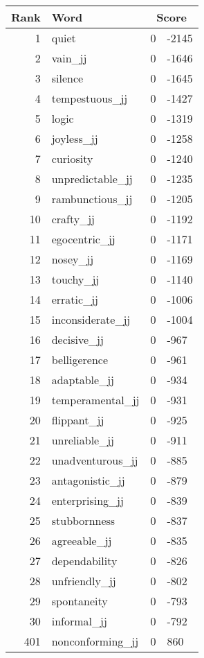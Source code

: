 \begin{longtable}[!htbp]{| rlr@{.}l |}
    \hline
    \textbf{Rank} & \textbf{Word} & \multicolumn{2}{c|}{\textbf{Score}} \\
    \hline
    \endhead
    1 & quiet & 0 & -2145 \\
    2 & vain\_jj & 0 & -1646 \\
    3 & silence & 0 & -1645 \\
    4 & tempestuous\_jj & 0 & -1427 \\
    5 & logic & 0 & -1319 \\
    6 & joyless\_jj & 0 & -1258 \\
    7 & curiosity & 0 & -1240 \\
    8 & unpredictable\_jj & 0 & -1235 \\
    9 & rambunctious\_jj & 0 & -1205 \\
    10 & crafty\_jj & 0 & -1192 \\
    11 & egocentric\_jj & 0 & -1171 \\
    12 & nosey\_jj & 0 & -1169 \\
    13 & touchy\_jj & 0 & -1140 \\
    14 & erratic\_jj & 0 & -1006 \\
    15 & inconsiderate\_jj & 0 & -1004 \\
    16 & decisive\_jj & 0 & -967 \\
    17 & belligerence & 0 & -961 \\
    18 & adaptable\_jj & 0 & -934 \\
    19 & temperamental\_jj & 0 & -931 \\
    20 & flippant\_jj & 0 & -925 \\
    21 & unreliable\_jj & 0 & -911 \\
    22 & unadventurous\_jj & 0 & -885 \\
    23 & antagonistic\_jj & 0 & -879 \\
    24 & enterprising\_jj & 0 & -839 \\
    25 & stubbornness & 0 & -837 \\
    26 & agreeable\_jj & 0 & -835 \\
    27 & dependability & 0 & -826 \\
    28 & unfriendly\_jj & 0 & -802 \\
    29 & spontaneity & 0 & -793 \\
    30 & informal\_jj & 0 & -792 \\
    401 & nonconforming\_jj & 0 & 860 \\

\end{longtable}
